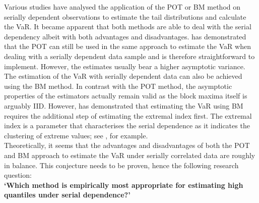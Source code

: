 \documentclass[a4paper,12pt]{article}
\theoremstyle{plain}
\begin{document}
Various studies have analysed the application of the POT or BM method on serially dependent observations to estimate the tail distributions and calculate the VaR. It became apparent that both methods are able to deal with the serial dependency albeit with both advantages and disadvantages.  has demonstrated that the POT can still be used in the same approach to estimate the VaR when dealing with a serially dependent data sample and is therefore straightforward to implement. However, the estimates usually bear a higher asymptotic variance. The estimation of the VaR with serially dependent data can also be achieved using the BM method. In contrast with the POT method, the asymptotic properties of the estimators actually remain valid as the block maxima itself is arguably IID. However,  has demonstrated that estimating the VaR using BM requires the additional step of estimating the extremal index first. The extremal index is a parameter that characterises the serial dependence as it indicates the clustering of extreme values; see , for example. \\

Theoretically, it seems that the advantages and disadvantages of both the POT and BM approach to estimate the VaR under serially correlated data are roughly in balance. This conjecture needs to be proven, hence the following research question:\\

\noindent \textbf{`Which method is empirically most appropriate for estimating high quantiles under serial dependence?'}\\
\end{document}
